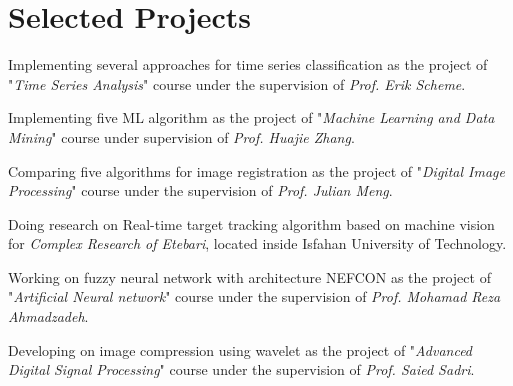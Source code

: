 \section{Selected Projects}

{Implementing several approaches for time series classification as the project of "\emph{Time Series Analysis}" course under the supervision of \emph{Prof. Erik Scheme}.}

{Implementing five ML algorithm as the project of "\emph{Machine Learning and Data Mining}" course under supervision of \emph{Prof. Huajie Zhang}.}

{Comparing five algorithms for image registration as the project of "\emph{Digital Image Processing}" course under the supervision of \emph{Prof. Julian Meng}.}

{Doing research on Real-time target tracking algorithm based on machine vision for \emph{Complex Research of Etebari}, located inside Isfahan University of Technology.}

{Working on fuzzy neural network with architecture NEFCON as the project of "\emph{Artificial Neural network}" course under the supervision of \emph{Prof. Mohamad Reza Ahmadzadeh}. }

{Developing on image compression using wavelet as the project of "\emph{Advanced Digital Signal Processing}" course under the supervision of \emph{Prof. Saied Sadri}. }